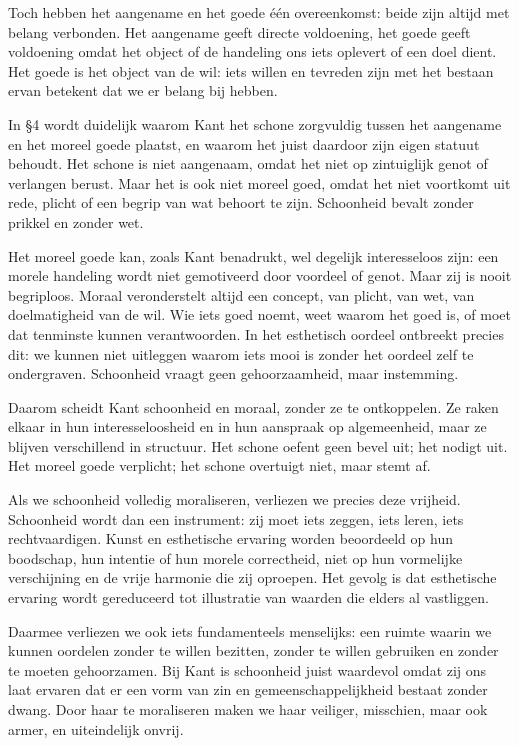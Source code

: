 \begin{mdframed}[leftmargin=0pt,rightmargin=0pt,backgroundcolor=blue!6,linecolor=white,innertopmargin=6pt,innerbottommargin=6pt]
Toch hebben het aangename en het goede één overeenkomst: beide zijn altijd met belang verbonden. Het aangename geeft directe voldoening, het goede geeft voldoening omdat het object of de handeling ons iets oplevert of een doel dient. Het goede is het object van de wil: iets willen en tevreden zijn met het bestaan ervan betekent dat we er belang bij hebben.

\bigskip
In §4 wordt duidelijk waarom Kant het schone zorgvuldig tussen het aangename en het moreel goede plaatst, en waarom het juist daardoor zijn eigen statuut behoudt. Het schone is niet aangenaam, omdat het niet op zintuiglijk genot of verlangen berust. Maar het is ook niet moreel goed, omdat het niet voortkomt uit rede, plicht of een begrip van wat behoort te zijn. Schoonheid bevalt zonder prikkel en zonder wet.

Het moreel goede kan, zoals Kant benadrukt, wel degelijk interesseloos zijn: een morele handeling wordt niet gemotiveerd door voordeel of genot. Maar zij is nooit begriploos. Moraal veronderstelt altijd een concept, van plicht, van wet, van doelmatigheid van de wil. Wie iets goed noemt, weet waarom het goed is, of moet dat tenminste kunnen verantwoorden. In het esthetisch oordeel ontbreekt precies dit: we kunnen niet uitleggen waarom iets mooi is zonder het oordeel zelf te ondergraven. Schoonheid vraagt geen gehoorzaamheid, maar instemming.

Daarom scheidt Kant schoonheid en moraal, zonder ze te ontkoppelen. Ze raken elkaar in hun interesseloosheid en in hun aanspraak op algemeenheid, maar ze blijven verschillend in structuur. Het schone oefent geen bevel uit; het nodigt uit. Het moreel goede verplicht; het schone overtuigt niet, maar stemt af.

Als we schoonheid volledig moraliseren, verliezen we precies deze vrijheid. Schoonheid wordt dan een instrument: zij moet iets zeggen, iets leren, iets rechtvaardigen. Kunst en esthetische ervaring worden beoordeeld op hun boodschap, hun intentie of hun morele correctheid, niet op hun vormelijke verschijning en de vrije harmonie die zij oproepen. Het gevolg is dat esthetische ervaring wordt gereduceerd tot illustratie van waarden die elders al vastliggen.

Daarmee verliezen we ook iets fundamenteels menselijks: een ruimte waarin we kunnen oordelen zonder te willen bezitten, zonder te willen gebruiken en zonder te moeten gehoorzamen. Bij Kant is schoonheid juist waardevol omdat zij ons laat ervaren dat er een vorm van zin en gemeenschappelijkheid bestaat zonder dwang. Door haar te moraliseren maken we haar veiliger, misschien, maar ook armer, en uiteindelijk onvrij.
\end{mdframed}

